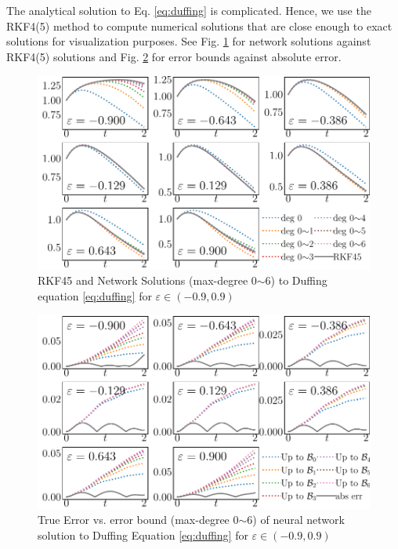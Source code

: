 \documentclass[accepted]{uai2023}
\begin{document}
    The analytical solution to Eq. \ref{eq:duffing} is complicated. 
    Hence, we use the RKF4(5) method to compute numerical solutions that are close enough to exact solutions for visualization purposes. 
    See Fig. \ref{fig:duffing-solution} for network solutions against RKF4(5) solutions and Fig. \ref{fig:duffing-error} for error bounds against absolute error.
    \begin{figure}[!ht]
        \centering
        \includegraphics[width=\linewidth]{assets/duffing-solution.pdf}
        \caption{\small RKF45 and Network Solutions (max-degree 0$\sim$6) to Duffing equation \ref{eq:duffing} for $\varepsilon \in (-0.9, 0.9)$}\label{fig:duffing-solution}
    \end{figure}
    \begin{figure}[!ht]
        \centering
        \includegraphics[width=\linewidth]{assets/duffing-error.pdf}
        \caption{\small True Error vs. error bound (max-degree 0$\sim$6) of neural network solution to Duffing Equation \ref{eq:duffing} for $\varepsilon \in (-0.9, 0.9)$}\label{fig:duffing-error}
    \end{figure}
\end{document}
